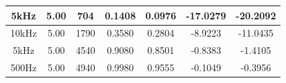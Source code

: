 \documentclass{article}
\begin{document}
\begin{table}[H]
\begin{tabular}{|c|c|c|c|c|c|c|}
		5kHz      & 5.00                                                                    & 704                                                                            & 0.1408                                                                  & 0.0976                                                                             & -17.0279                                                                        & -20.2092                                                                                   \\ \hline
		10kHz     & 5.00                                                                    & 1790                                                                           & 0.3580                                                                  & 0.2804                                                                             & -8.9223                                                                         & -11.0435                                                                                   \\ \hline
		5kHz      & 5.00                                                                    & 4540                                                                           & 0.9080                                                                  & 0.8501                                                                             & -0.8383                                                                         & -1.4105                                                                                    \\ \hline
		500Hz     & 5.00                                                                    & 4940                                                                           & 0.9980                                                                  & 0.9555                                                                             & -0.1049                                                                         & -0.3956                                                                                    \\ \hline
	\end{tabular}
\end{table}
\end{document}
